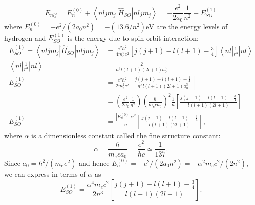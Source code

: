 $$
E_{n l j}=E_{n}^{(0)}+\left\langle n l j m_{j}\left|\hat{H}_{S O}\right| n l j m_{j}\right\rangle=-\frac{e^{2}}{2 a_{0}} \frac{1}{n^{2}}+E_{S O}^{(1)}
$$
where $E_{n}^{(0)}=-e^{2} /\left(2 a_{0} n^{2}\right)=-\left(13.6 / n^{2}\right) \mathrm{eV}$ are the energy levels of hydrogen and $E_{S O}^{(1)}$ is the energy due to spin-orbit interaction:
	$$
	\begin{aligned}
	E_{S O}^{(1)}=\left\langle n l j m_{j}\left|\hat{H}_{S O}\right| n l j m_{j}\right\rangle&=\frac{e^{2} \hbar^{2}}{4 m_{e}^{2} c^{2}}\left[j(j+1)-l(l+1)-\frac{3}{4}\right]\left\langle n l\left|\frac{1}{r^{3}}\right| n l\right\rangle\\
	\left\langle n l\left|\frac{1}{r^{3}}\right| n l\right\rangle&=\frac{2}{n^{3} l(l+1)(2 l+1) a_{0}^{3}}\\
	E_{S O}^{(1)}&=\frac{e^{2} \hbar^{2}}{2 m_{e}^{2} c^{2}}\left[\frac{j(j+1)-l(l+1)-\frac{3}{4}}{n^{3} l(l+1)(2 l+1) a_{0}^{3}}\right]\\
		&=\left(\frac{e^{2}}{2 a_{0}} \frac{1}{n^{2}}\right)\left(\frac{\hbar}{m_{e} c a_{0}}\right)^{2} \frac{1}{n}\left[\frac{j(j+1)-l(l+1)-\frac{3}{4}}{l(l+1)(2 l+1)}\right] \\
	E_{S O}^{(1)}&=\frac{\left|E_{n}^{(0)}\right| \alpha^{2}}{n}\left[\frac{j(j+1)-l(l+1)-\frac{3}{4}}{l(l+1)(2 l+1)}\right],
\end{aligned}
$$
where $\alpha$ is a dimensionless constant called the fine structure constant:
$$
\alpha=\frac{\hbar}{m_{e} c a_{0}}=\frac{e^{2}}{\hbar c} \simeq \frac{1}{137} .
$$
Since $a_{0}=\hbar^{2} /\left(m_{e} e^{2}\right)$ and hence $E_{n}^{(0)}=-e^{2} /\left(2 a_{0} n^{2}\right)=-\alpha^{2} m_{e} c^{2} /\left(2 n^{2}\right)$, we can express in terms of $\alpha$ as
$$
E_{S O}^{(1)}=\frac{\alpha^{4} m_{e} c^{2}}{2 n^{3}}\left[\frac{j(j+1)-l(l+1)-\frac{3}{4}}{l(l+1)(2 l+1)}\right] .
$$
